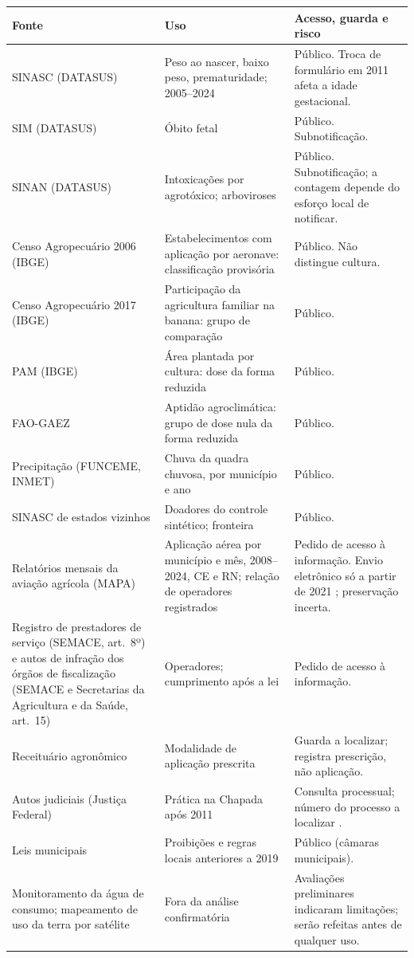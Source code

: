 \begin{apendicesenv}
\begin{quadro}[htb]
\caption{\label{qua:fontes}Fontes de dados, uso e acesso}
\centering
\footnotesize
\begin{tabular}{@{}p{3.6cm}p{5.6cm}p{5.3cm}@{}}
\toprule
Fonte & Uso & Acesso, guarda e risco \\
\midrule
SINASC (DATASUS) & Peso ao nascer, baixo peso, prematuridade; 2005--2024 & Público. Troca de formulário em 2011 afeta a idade gestacional. \\
SIM (DATASUS) & Óbito fetal & Público. Subnotificação. \\
SINAN (DATASUS) & Intoxicações por agrotóxico; arboviroses & Público. Subnotificação; a contagem depende do esforço local de notificar. \\
Censo Agropecuário 2006 (IBGE) & Estabelecimentos com aplicação por aeronave: classificação provisória & Público. Não distingue cultura. \\
Censo Agropecuário 2017 (IBGE) & Participação da agricultura familiar na banana: grupo de comparação & Público. \\
PAM (IBGE) & Área plantada por cultura: dose da forma reduzida & Público. \\
FAO-GAEZ & Aptidão agroclimática: grupo de dose nula da forma reduzida & Público. \\
Precipitação (FUNCEME, INMET) & Chuva da quadra chuvosa, por município e ano & Público. \\
SINASC de estados vizinhos & Doadores do controle sintético; fronteira & Público. \\
Relatórios mensais da aviação agrícola (MAPA) & Aplicação aérea por município e mês, 2008--2024, CE e RN; relação de operadores registrados & Pedido de acesso à informação. Envio eletrônico só a partir de 2021 \cite{sindag2021plataforma}; preservação incerta. \\
Registro de prestadores de serviço (SEMACE, art.~8º) e autos de infração dos órgãos de fiscalização (SEMACE e Secretarias da Agricultura e da Saúde, art.~15) \cite{ceara1993lei12228} & Operadores; cumprimento após a lei & Pedido de acesso à informação. \\
Receituário agronômico \cite{brasil2002decreto4074} & Modalidade de aplicação prescrita & Guarda a localizar; registra prescrição, não aplicação. \\
Autos judiciais (Justiça Federal) & Prática na Chapada após 2011 & Consulta processual; número do processo a localizar \cite{mpt2011apodi}. \\
Leis municipais & Proibições e regras locais anteriores a 2019 & Público (câmaras municipais). \\
Monitoramento da água de consumo; mapeamento de uso da terra por satélite & Fora da análise confirmatória & Avaliações preliminares indicaram limitações; serão refeitas antes de qualquer uso. \\
\bottomrule
\end{tabular}
\end{quadro}


\end{apendicesenv}
